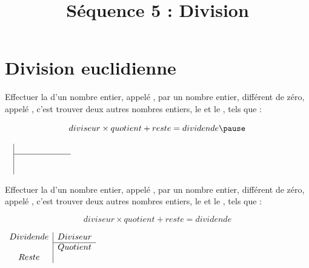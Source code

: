 \documentclass[xcolor={dvipsnames}]{beamer}
\title{Séquence 5 : Division}
\date{ }
\begin{document}
\begin{frame}
  \titlepage 
\end{frame}


\begin{frame}{}
	
\end{frame}

\section{Division euclidienne}

\begin{frame}
	\begin{mydef}
		Effectuer la  d’un nombre entier, appelé \pause  {}, par un nombre entier, différent de zéro, appelé \pause  {}, c’est trouver deux autres nombres entiers, le \pause {} et le , tels que : \pause
		
		\begin{equation*}
			diviseur \times quotient + reste = dividende \pause	
		\end{equation*}
	\end{mydef}

	\begin{center}
		$\begin{array}{c|c}
			 & \hspace*{2cm} \\
			\cline{2-2}
			&  \\
			 & \\
		\end{array}$
	\end{center}

\end{frame}


\begin{frame}
	\begin{mydef}
		Effectuer la  d’un nombre entier, appelé   , par un nombre entier, différent de zéro, appelé   , c’est trouver deux autres nombres entiers, le   et le , tels que : 
		
		\begin{equation*}
			diviseur \times quotient + reste = dividende 
		\end{equation*}
	\end{mydef}
	
	\begin{center}
		$\begin{array}{c|c}
			Dividende & Diviseur \\
			\cline{2-2}
			& Quotient \\
			Reste & \\
		\end{array}$
	\end{center}
	
\end{frame}
\end{document}
